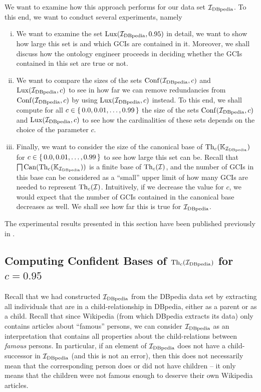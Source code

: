 We want to examine how this approach performs for our data set ${\mathcal{I}_{\text{DBpedia}}}$.  To this end,
we want to conduct several experiments, namely
\begin{enumerate}[i. ]
\item We want to examine the set $\operatorname{Lux}({\mathcal{I}_{\text{DBpedia}}}, 0.95)$ in detail, \ie we want to show
  how large this set is and which GCIs are contained in it.  Moreover, we shall discuss
  how the ontology engineer proceeds in deciding whether the GCIs contained in this set
  are true or not.
\item We want to compare the sizes of the sets $\operatorname{Conf}({\mathcal{I}_{\text{DBpedia}}}, c)$ and $\operatorname{Lux}({\mathcal{I}_{\text{DBpedia}}},
  c)$ to see in how far we can remove redundancies from $\operatorname{Conf}({\mathcal{I}_{\text{DBpedia}}}, c)$ by using
  $\operatorname{Lux}({\mathcal{I}_{\text{DBpedia}}}, c)$ instead.  To this end, we shall compute for all $c \in {\ensuremath{\{\, 0.0,
    0.01, \dots, 0.99\,\}}}$ the size of the sets $\operatorname{Conf}({\mathcal{I}_{\text{DBpedia}}}, c)$ and $\operatorname{Lux}({\mathcal{I}_{\text{DBpedia}}},
  c)$ to see how the cardinalities of these sets depends on the choice of the parameter
  $c$.
\item Finally, we want to consider the size of the canonical base of $\operatorname{Th}_c({\mathbb{K}}_{\mathcal{I}_{\text{DBpedia}}})$ for $c \in {\ensuremath{\{\, 0.0, 0.01, \dots, 0.99 \,\}}}$ to see how large this set can
  be.  Recall that $\bigsqcap \operatorname{Can}(\operatorname{Th}_c({\mathbb{K}}_{\mathcal{I}_{\text{DBpedia}}}))$ is a finite base of
  $\operatorname{Th}_c(\mathcal{I})$, and the number of GCIs in this base can be considered as a
  \enquote{small} upper limit of how many GCIs are needed to represent
  $\operatorname{Th}_c(\mathcal{I})$.  Intuitively, if we decrease the value for $c$, we would expect
  that the number of GCIs contained in the canonical base decreases as well.  We shall see
  how far this is true for ${\mathcal{I}_{\text{DBpedia}}}$.
\end{enumerate}

The experimental results presented in this section have been published previously in
\cite{Borchmann-LTCS-12-06}.

\subsection{Computing Confident Bases of $\operatorname{Th}_c({\mathcal{I}_{\text{DBpedia}}})$ for $c = 0.95$}
\label{sec:comp-conf-bases}

Recall that we had constructed ${\mathcal{I}_{\text{DBpedia}}}$ from the DBpedia data set by extracting all
individuals that are in a \textsf{child}-relationship in DBpedia, either as a parent or as
a child.  Recall that since Wikipedia (from which DBpedia extracts its data) only contains
articles about \enquote{famous} persons, we can consider ${\mathcal{I}_{\text{DBpedia}}}$ as an interpretation
that contains all properties about the child-relations between \emph{famous} persons.  In
particular, if an element of ${\mathcal{I}_{\text{DBpedia}}}$ does not have a \textsf{child}-successor in
${\mathcal{I}_{\text{DBpedia}}}$ (and this is not an error), then this does not necessarily mean that the
corresponding person does or did not have children -- it only means that the children were
not famous enough to deserve their own Wikipedia articles.

